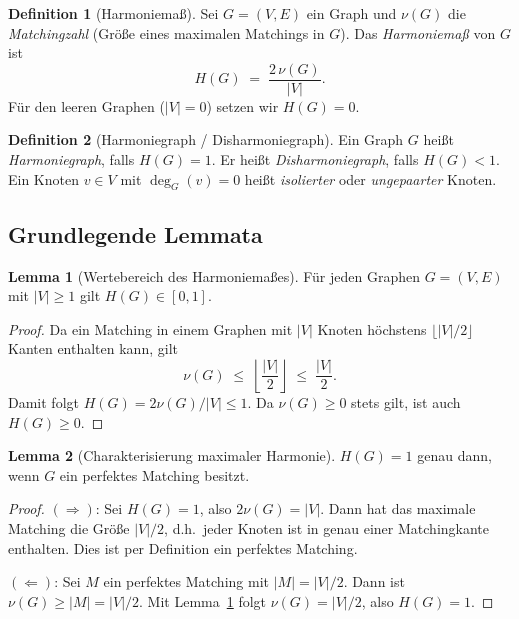 ﻿\documentclass[a4paper,12pt]{article}
\theoremstyle{definition}
\newtheorem{definition}{Definition}
\newtheorem{lemma}{Lemma}
\begin{document}
\begin{definition}[Harmoniemaß]
	\label{def:harmoniemass}
	Sei $G = (V, E)$ ein Graph und $\nu(G)$ die \emph{Matchingzahl} (Größe eines
	maximalen Matchings in $G$). Das \emph{Harmoniemaß} von $G$ ist
	\[
		H(G) \;=\; \frac{2\,\nu(G)}{|V|}.
	\]
	Für den leeren Graphen ($|V| = 0$) setzen wir $H(G) = 0$.
\end{definition}

\begin{definition}[Harmoniegraph / Disharmoniegraph]
	Ein Graph $G$ heißt \emph{Harmoniegraph}, falls $H(G) = 1$.
	Er heißt \emph{Disharmoniegraph}, falls $H(G) < 1$.
	Ein Knoten $v \in V$ mit $\deg_G(v) = 0$ heißt \emph{isolierter} oder
	\emph{ungepaarter} Knoten.
\end{definition}

\subsection{Grundlegende Lemmata}

\begin{lemma}[Wertebereich des Harmoniemaßes]
	\label{lem:bereich}
	Für jeden Graphen $G = (V, E)$ mit $|V| \geq 1$ gilt $H(G) \in [0, 1]$.
\end{lemma}

\begin{proof}
	Da ein Matching in einem Graphen mit $|V|$ Knoten höchstens $\lfloor |V|/2 \rfloor$
	Kanten enthalten kann, gilt
	\[
		\nu(G) \;\leq\; \left\lfloor \frac{|V|}{2} \right\rfloor \;\leq\; \frac{|V|}{2}.
	\]
	Damit folgt $H(G) = 2\nu(G)/|V| \leq 1$.
	Da $\nu(G) \geq 0$ stets gilt, ist auch $H(G) \geq 0$.
\end{proof}

\begin{lemma}[Charakterisierung maximaler Harmonie]
	\label{lem:perfekt}
	$H(G) = 1$ genau dann, wenn $G$ ein perfektes Matching besitzt.
\end{lemma}

\begin{proof}
	$(\Rightarrow)$: Sei $H(G) = 1$, also $2\nu(G) = |V|$. Dann hat das maximale
	Matching die Größe $|V|/2$, d.h.\ jeder Knoten ist in genau einer Matchingkante
	enthalten. Dies ist per Definition ein perfektes Matching.
	
	$(\Leftarrow)$: Sei $M$ ein perfektes Matching mit $|M| = |V|/2$. Dann ist
	$\nu(G) \geq |M| = |V|/2$. Mit Lemma~\ref{lem:bereich} folgt $\nu(G) = |V|/2$,
	also $H(G) = 1$.
\end{proof}
\end{document}
